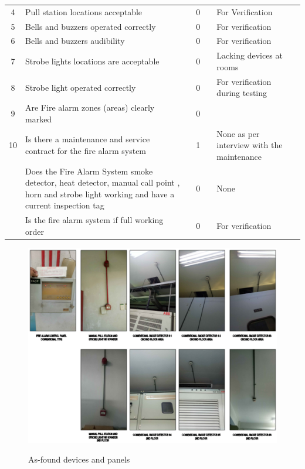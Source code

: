 \begin{table}[!h]
{\begin{tabular}{c|p{5cm}|c|c|c|p{4cm}|p{1cm}}
		4 & Pull station locations acceptable &  & 0 &  & For Verification &  \\ 
		5 & Bells and buzzers operated correctly &  & 0 &  & For verification &  \\ 
		6 & Bells and buzzers audibility &  & 0 &  & For verification &  \\ 
		7 & Strobe lights locations are acceptable &  & 0 &  & Lacking devices at rooms &  \\ 
		8 & Strobe light operated correctly &  & 0 &  & For verification during testing &  \\ 
		9 & Are Fire alarm zones (areas) clearly marked &  & 0 &  &  &  \\ 
		10 & Is there a maintenance and service contract for the fire alarm system &  & 1 &  & None as per interview with the maintenance &  \\ 
		& Does the Fire Alarm System smoke detector, heat detector, manual call point , horn and strobe light working and  have a current inspection tag &  & 0 &  & None &  \\ 
		& Is the fire alarm system if full working order &  & 0 &  & For verification &  \\ 
		\hline
	\end{tabular}
		
	}
\end{table}

\begin{figure}[!htb]
	\includegraphics[scale=1.7]{figures/ch04_fig_fdas01} \\
	\caption{As-found devices and panels}
	\label{ch04_fig_fdas01} 
\end{figure}



